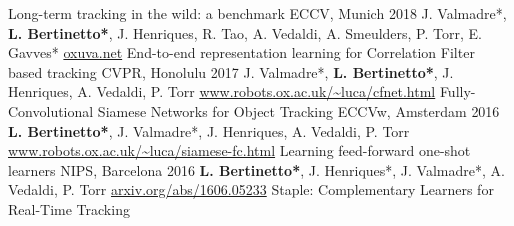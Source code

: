 \begin{cvpapers}
  \cvpapertitle
    {Long-term tracking in the wild: a benchmark} %
    {ECCV, Munich} %
    {2018} %
  \cvpaperauthors
    {J. Valmadre*, \textbf{L. Bertinetto*}, J. Henriques, R. Tao, A. Vedaldi, A. Smeulders, P. Torr, E. Gavves*}
    {} %
    {} %
  \cvpaperurl
    {\href{http://oxuva.net}{oxuva.net}}
    {} %
    {} %
  \cvpapertitle
    {End-to-end representation learning for Correlation Filter based tracking} %
    {CVPR, Honolulu} %
    {2017} %
  \cvpaperauthors
    {J. Valmadre*, \textbf{L. Bertinetto*}, J. Henriques, A. Vedaldi, P. Torr}
    {} %
    {} %
  \cvpaperurl
    {\href{http://www.robots.ox.ac.uk/~luca/cfnet.html}{www.robots.ox.ac.uk/\textasciitilde luca/cfnet.html}}
    {} %
    {} %
  \cvpapertitle
    {Fully-Convolutional Siamese Networks for Object Tracking} %
    {ECCVw, Amsterdam} %
    {2016} %
  \cvpaperauthors
    {\textbf{L. Bertinetto*}, J. Valmadre*, J. Henriques, A. Vedaldi, P. Torr}
    {} %
    {} %
  \cvpaperurl
    {\href{http://www.robots.ox.ac.uk/~luca/siamese-fc.html}{www.robots.ox.ac.uk/\textasciitilde luca/siamese-fc.html}}
    {} %
    {} %
  \cvpapertitle
    {Learning feed-forward one-shot learners} %
    {NIPS, Barcelona} %
    {2016} %
  \cvpaperauthors
    {\textbf{L. Bertinetto*}, J. Henriques*, J. Valmadre*, A. Vedaldi, P. Torr}
    {} %
    {} %
  \cvpaperurl
    {\href{http://arxiv.org/abs/1606.05233}{arxiv.org/abs/1606.05233}}
    {} %
    {} %
  \cvpapertitle
    {Staple: Complementary Learners for Real-Time Tracking} %

\end{cvpapers}
